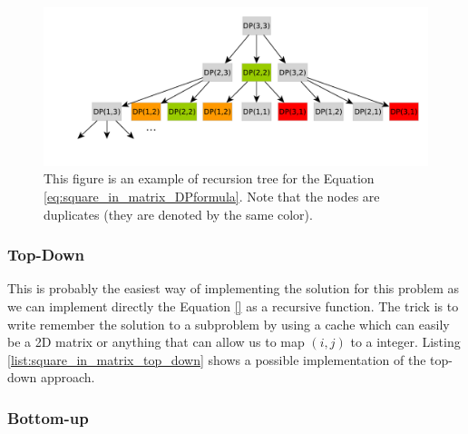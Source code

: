 \begin{figure}
	\centering
	\label{fig:square_in_matrix:recursiontree}
	\includegraphics[width=\textwidth]{sources/square_in_matrix/images/recursiontree}
	\caption{This figure is an example of recursion tree for the Equation
	\ref{eq:square_in_matrix_DPformula}. Note that the nodes are duplicates
	(they are denoted by the same color). }
\end{figure}

\subsubsection{Top-Down}
\label{sec:square_in_matrix:top_down}
This is probably the easiest way of implementing the solution for this problem
as we can implement directly the Equation \ref{} as a recursive function. The
trick is to write remember the solution to a subproblem by using a cache which
can easily be a 2D matrix or anything that can allow us to map $(i,j)$ to a
integer. Listing \ref{list:square_in_matrix_top_down} shows a possible
implementation of the top-down approach. 







\subsubsection{Bottom-up}
\label{sec:square_in_matrix:bottom-up}







